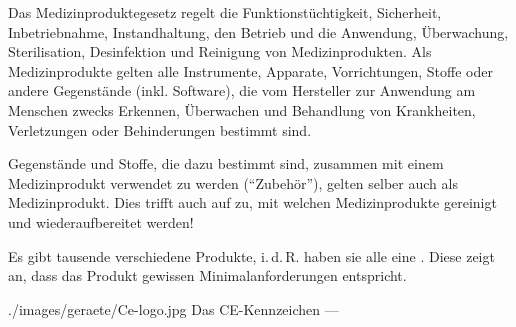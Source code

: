 \TextSlideTeaser
{\TxBeschreibung}%
{%
\noindent Das Medizinproduktegesetz regelt die Funktionstüchtigkeit,
Sicherheit, Inbetriebnahme, Instandhaltung, den Betrieb und
die Anwendung, Überwachung, Sterilisation, Desinfektion und
Reinigung von Medizinprodukten. Als Medizinprodukte gelten
alle Instrumente, Apparate, Vorrichtungen, Stoffe oder
andere Gegenstände (inkl. Software), die vom Hersteller zur
Anwendung am Menschen zwecks Erkennen, Überwachen und Behandlung von
Krankheiten, Verletzungen oder Behinderungen bestimmt sind.

Gegenstände und Stoffe, die dazu bestimmt sind, zusammen mit einem
Medizinprodukt verwendet zu werden (\enquote{Zubehör}), gelten selber auch als
Medizinprodukt. Dies trifft auch auf  zu, mit welchen
Medizinprodukte gereinigt und wiederaufbereitet werden!


Es gibt tausende verschiedene Produkte, i.\,d.\,R. haben sie
alle eine . Diese zeigt an, dass das
Produkt gewissen Minimalanforderungen entspricht. }%
{}%
{./images/geraete/Ce-logo.jpg}%
{}%
{}%
{Das CE-Kennzeichen}%
{---}%


